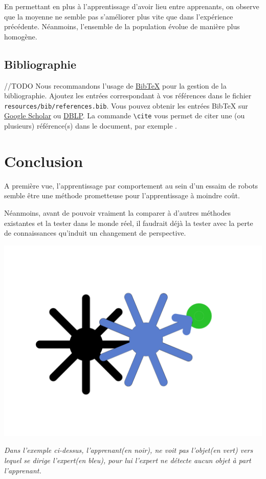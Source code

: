 \documentclass[a4paper, 12pt]{report}
\begin{document}
	En permettant en plus à l'apprentissage d'avoir lieu entre apprenants, on observe que la moyenne ne semble pas s'améliorer plus vite que dans l'expérience précédente. Néanmoins, l'ensemble de la population évolue de manière plus homogène.

    \section{Bibliographie}
//TODO
Nous recommandons l'usage de \href{https://fr.wikipedia.org/wiki/BibTeX}{BibTeX} pour la gestion de la bibliographie. Ajoutez les entrées correspondant à vos références dans le fichier \verb+resources/bib/references.bib+. Vous pouvez obtenir les entrées BibTeX sur \href{https://scholar.google.com}{Google Scholar} ou \href{https://dblp.uni-trier.de}{DBLP}. La commande \verb+\cite+ vous permet de citer une (ou plusieurs) référence(s) dans le document, par exemple \cite{pakin2020comprehensive,RusselNorvig}.

\chapter{Conclusion}

A première vue, l'apprentissage par comportement au sein d'un essaim de robots semble être une méthode prometteuse pour l'apprentissage à moindre coût.

Néanmoins, avant de pouvoir vraiment la comparer à d'autres méthodes existantes et la tester dans le monde réel, il faudrait déjà la tester avec la perte de connaissances qu'induit un changement de perspective.
\begin{center}
	\includegraphics[scale = 0.5]{scheme.png}
\end{center}
\textit{Dans l'exemple ci-dessus, l'apprenant(en noir), ne voit pas l'objet(en vert) vers lequel se dirige l'expert(en bleu), pour lui l'expert ne détecte aucun objet à part l'apprenant.}
\end{document}
